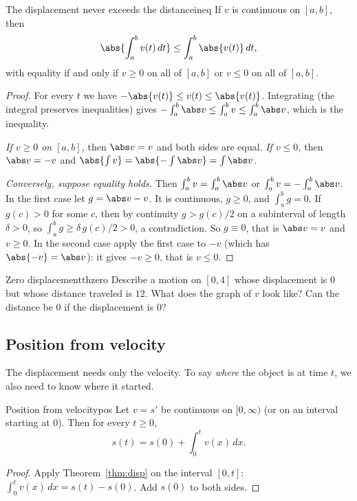 \documentclass[11pt]{article}
\begin{document}
\begin{thm}{The displacement never exceeds the distance}{ineq}
If $v$ is continuous on $[a,b]$, then
\[
\abs{\int_a^bv(t)\,dt}\le\int_a^b\abs{v(t)}\,dt ,
\]
with equality if and only if $v\ge0$ on all of $[a,b]$ or $v\le0$ on all of $[a,b]$.
\end{thm}
\begin{proof}
For every $t$ we have $-\abs{v(t)}\le v(t)\le\abs{v(t)}$. Integrating (the integral preserves inequalities) gives $-\int_a^b\abs v\le\int_a^bv\le\int_a^b\abs v$, which is the inequality.

\emph{If $v\ge0$ on $[a,b]$,} then $\abs v=v$ and both sides are equal. \emph{If $v\le0$,} then $\abs v=-v$ and $\abs{\int v}=\abs{-\int\abs v}=\int\abs v$.

\emph{Conversely, suppose equality holds.} Then $\int_a^bv=\int_a^b\abs v$ or $\int_a^bv=-\int_a^b\abs v$. In the first case let $g=\abs v-v$. It is continuous, $g\ge0$, and $\int_a^bg=0$. If $g(c)>0$ for some $c$, then by continuity $g>g(c)/2$ on a subinterval of length $\delta>0$, so $\int_a^bg\ge\delta\,g(c)/2>0$, a contradiction. So $g\equiv0$, that is $\abs v=v$ and $v\ge0$. In the second case apply the first case to $-v$ (which has $\abs{-v}=\abs v$): it gives $-v\ge0$, that is $v\le0$.
\end{proof}

\begin{think}{Zero displacement}{thzero}
Describe a motion on $[0,4]$ whose displacement is $0$ but whose distance traveled is $12$. What does the graph of $v$ look like? Can the distance be $0$ if the displacement is $0$?
\end{think}

\subsection*{Position from velocity}

The displacement needs only the velocity. To say \emph{where} the object is at time $t$, we also need to know where it started.

\begin{thm}{Position from velocity}{pos}
Let $v=s'$ be continuous on $[0,\infty)$ (or on an interval starting at $0$). Then for every $t\ge0$,
\[
s(t)=s(0)+\int_0^tv(x)\,dx .
\]
\end{thm}
\begin{proof}
Apply Theorem~\ref{thm:disp} on the interval $[0,t]$: $\int_0^tv(x)\,dx=s(t)-s(0)$. Add $s(0)$ to both sides.
\end{proof}
\end{document}
